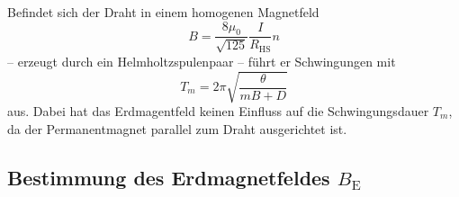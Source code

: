 Befindet sich der Draht in einem homogenen Magnetfeld 
\begin{equation}
B=\frac{8\mu_0}{\sqrt{125}} \frac{I}{R_\mathup{HS}}n
\label{eq:B_HS}
\end{equation}
 -- erzeugt durch ein Helmholtzspulenpaar -- führt er Schwingungen mit 
\begin{equation}
T_m=2\pi\sqrt{\frac{\theta}{mB+D}}
\end{equation}
aus. Dabei hat das Erdmagentfeld keinen Einfluss auf die Schwingungsdauer $T_m$, da der Permanentmagnet parallel zum Draht ausgerichtet ist.

\subsection{Bestimmung des Erdmagnetfeldes $B_\mathup{E}$}

